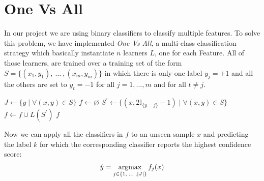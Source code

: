 \chapter{One Vs All}
In our project we are using binary classifiers to classify multiple features. To solve this problem, we have implemented \textit{One Vs All}, a multi-class classification strategy which basically instantiate $n$ learners $L$, one for each Feature. All of those learners, are trained over a training set of the form $S=\lbrace (x_{1},y_{1}),\:\dots\:,(x_{m},y_{m}) \rbrace$ in which there is only one label $y_{j}=+1$ and all the others are set to $y_{t}=-1$ for all $j = 1,\dots,m$ and for all $t \neq j$.



\begin{algorithm}[htpb]
	\caption{}
	\label{alg:dstumps}
	\begin{algorithmic}[1]
		\State $J \gets \lbrace y\; |\; \forall(x,y)\in S\rbrace$
		\State $f \gets \varnothing $
			\State $S^{\prime} \gets \lbrace (x, 2\mathbb{I}_{\lbrace y = j \rbrace} -1) \; |\; \forall(x, y)\in S \rbrace$
			\State $f \gets f \cup L(S^{\prime})$
		\EndFor
		\Return $f$
		\EndProcedure
	\end{algorithmic}
\end{algorithm}
Now we can apply all the classifiers in $f$ to an unseen sample $x$ and predicting the label $k$ for which the corresponding classifier reports the highest confidence score:
\begin{align*}
	\hat{y}=\operatorname*{argmax}_{j\in\lbrace 1,\;\dots\;, |J|\rbrace} f_{j}(x)
\end{align*} 

















